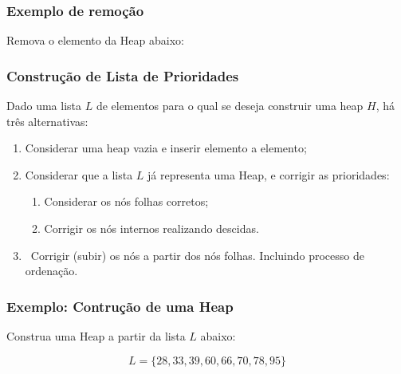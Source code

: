 \documentclass[10pt]{beamer}
\def\link{\href{https://www.cs.usfca.edu/~galles/visualization/HeapSort.html}{\beamergotobutton{Link}}}
\begin{document}
\begin{frame}[t]
    \frametitle{Exemplo de remoção}
    \large
    Remova o elemento da Heap abaixo:

    \centering
\end{frame}


\begin{frame}[t]
    \frametitle{Construção de Lista de Prioridades}
    \large
    Dado uma lista $L$ de elementos para o qual se deseja construir uma heap $H$, há três alternativas:\vspace*{1em}
    \begin{enumerate}[<+-|alert@+>]
        \large\setlength{\itemsep}{1em}
        \item Considerar uma heap vazia e inserir elemento a elemento;
        \item Considerar que a lista $L$ já representa uma Heap, e corrigir as prioridades:\vspace*{1em}
              \begin{enumerate}
                  \large\setlength{\itemsep}{1em}
                  \item Considerar os nós folhas corretos;
                  \item Corrigir os nós internos realizando descidas.
              \end{enumerate}
        \item \link\ Corrigir (subir) os nós a partir dos nós folhas. Incluindo processo de ordenação.
    \end{enumerate}
\end{frame}

\begin{frame}[t]
    \frametitle{Exemplo: Contrução de uma Heap}
    \large
    Construa uma Heap a partir da lista $L$ abaixo:

    $$L =\{28,33,39,60,66,70,78,95\}$$


\end{frame}
\end{document}
